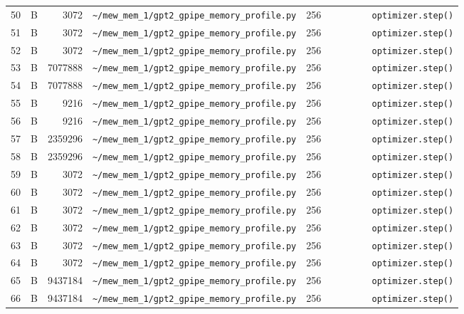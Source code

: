 \documentclass{article}
\begin{document}
\begin{longtable}{r l r p{6.5cm} r p{7.0cm}}
50 & B & 3072 & \lstinline|~/mew_mem_1/gpt2_gpipe_memory_profile.py| & 256 & \lstinline|        optimizer.step()| \\
51 & B & 3072 & \lstinline|~/mew_mem_1/gpt2_gpipe_memory_profile.py| & 256 & \lstinline|        optimizer.step()| \\
52 & B & 3072 & \lstinline|~/mew_mem_1/gpt2_gpipe_memory_profile.py| & 256 & \lstinline|        optimizer.step()| \\
53 & B & 7077888 & \lstinline|~/mew_mem_1/gpt2_gpipe_memory_profile.py| & 256 & \lstinline|        optimizer.step()| \\
54 & B & 7077888 & \lstinline|~/mew_mem_1/gpt2_gpipe_memory_profile.py| & 256 & \lstinline|        optimizer.step()| \\
55 & B & 9216 & \lstinline|~/mew_mem_1/gpt2_gpipe_memory_profile.py| & 256 & \lstinline|        optimizer.step()| \\
56 & B & 9216 & \lstinline|~/mew_mem_1/gpt2_gpipe_memory_profile.py| & 256 & \lstinline|        optimizer.step()| \\
57 & B & 2359296 & \lstinline|~/mew_mem_1/gpt2_gpipe_memory_profile.py| & 256 & \lstinline|        optimizer.step()| \\
58 & B & 2359296 & \lstinline|~/mew_mem_1/gpt2_gpipe_memory_profile.py| & 256 & \lstinline|        optimizer.step()| \\
59 & B & 3072 & \lstinline|~/mew_mem_1/gpt2_gpipe_memory_profile.py| & 256 & \lstinline|        optimizer.step()| \\
60 & B & 3072 & \lstinline|~/mew_mem_1/gpt2_gpipe_memory_profile.py| & 256 & \lstinline|        optimizer.step()| \\
61 & B & 3072 & \lstinline|~/mew_mem_1/gpt2_gpipe_memory_profile.py| & 256 & \lstinline|        optimizer.step()| \\
62 & B & 3072 & \lstinline|~/mew_mem_1/gpt2_gpipe_memory_profile.py| & 256 & \lstinline|        optimizer.step()| \\
63 & B & 3072 & \lstinline|~/mew_mem_1/gpt2_gpipe_memory_profile.py| & 256 & \lstinline|        optimizer.step()| \\
64 & B & 3072 & \lstinline|~/mew_mem_1/gpt2_gpipe_memory_profile.py| & 256 & \lstinline|        optimizer.step()| \\
65 & B & 9437184 & \lstinline|~/mew_mem_1/gpt2_gpipe_memory_profile.py| & 256 & \lstinline|        optimizer.step()| \\
66 & B & 9437184 & \lstinline|~/mew_mem_1/gpt2_gpipe_memory_profile.py| & 256 & \lstinline|        optimizer.step()| \\

\end{longtable}
\end{document}
